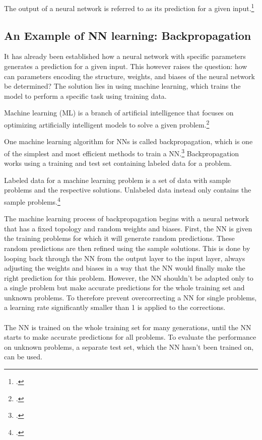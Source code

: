 \documentclass[11pt]{report}
\newcommand{\mydeflabel}{}
\newenvironment{mydef}[1]
{\renewcommand\mydeflabel{#1}\begin{mydefinner}}
{\end{mydefinner}}
\begin{document}
    \begin{mydef}{NN Prediction}
        The output of a neural network is referred to as its prediction for a given input.\footcite{Warudkar2020}
    \end{mydef}

    \subsection{An Example of NN learning: Backpropagation}\label{subsec:an-example-of-nn-learning:-backpropagation}
    It has already been established how a neural network with specific parameters generates a prediction for a given input.
    This however raises the question: how can parameters encoding the structure, weights, and biases of the neural network be determined?
    The solution lies in using machine learning, which trains the model to perform a specific task using training data.
    \begin{mydef}{Machine Learning}
        Machine learning (ML) is a branch of artificial intelligence that focuses on optimizing artificially intelligent models to solve a given problem.\footcite{IBM_Machine_Learning}
    \end{mydef}
    One machine learning algorithm for NNs is called backpropagation, which is one of the simplest and most efficient methods to train a NN.\footcite{Al-Masri2024}
    Backpropagation works using a training and test set containing labeled data for a problem.
    \begin{mydef}{(Un)labeled Data}
        Labeled data for a machine learning problem is a set of data with sample problems and the respective solutions.
        Unlabeled data instead only contains the sample problems.\footcite{IBM_Data_Labeling}
    \end{mydef}
    The machine learning process of backpropagation begins with a neural network that has a fixed topology and random weights and biases.
    First, the NN is given the training problems for which it will generate random predictions.
    These random predictions are then refined using the sample solutions.
    This is done by looping back through the NN from the output layer to the input layer, always adjusting the weights and biases in a way that the NN would finally make the right prediction for this problem.
    However, the NN shouldn't be adapted only to a single problem but make accurate predictions for the whole training set and unknown problems.
    To therefore prevent overcorrecting a NN for single problems, a learning rate significantly smaller than 1 is applied to the corrections.
    \\ \\
    The NN is trained on the whole training set for many generations, until the NN starts to make accurate predictions for all problems.
    To evaluate the performance on unknown problems, a separate test set, which the NN hasn't been trained on, can be used.
\end{document}
